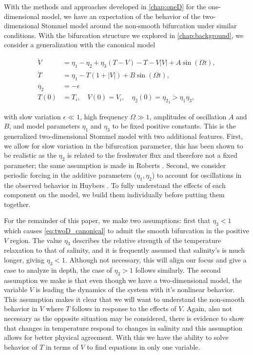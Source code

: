 With the methods and approaches developed in \autoref{chap:oneD} for the one-dimensional model, we have an expectation of the behavior of the two-dimensional Stommel model around the non-smooth bifurcation under similar conditions. With the bifurcation structure we explored in \autoref{chap:background}, we consider a generalization with the canonical model

\begin{equation}\label{eq:twoD_canonical}
  \begin{aligned}
   \dot{V} & =  \eta_1-\eta_2+\eta_3(T-V)-T-V|V|+A\sin(\Omega t), \\
   \dot{T}     & =  \eta_1-T(1+|V|)+B\sin(\Omega t),  \\
  \dot{\eta_2}  & =  -\epsilon\\
  T(0)&=T_i,\quad V(0)=V_i,\quad \eta_2(0)={\eta_2}_i>\eta_1\eta_3,
  \end{aligned}
\end{equation}

with slow variation $\epsilon\ll 1$, high frequency $\Omega\gg 1$, amplitudes of oscillation $A$ and $B$, and model parameters $\eta_1$ and $\eta_3$ to be fixed positive constants. This is the generalized two-dimensional Stommel model with two additional features. First, we allow for slow variation in the bifurcation parameter, this has been shown to be realistic as the $\eta_2$ is related to the freshwater flux and therefore not a fixed parameter; the same assumption is made in Roberts \cite{roberts2017relaxation}. Second, we consider periodic forcing in the additive parameters ($\eta_1,\eta_2$) to account for oscillations in the observed behavior in Huybers \cite{huybers2005obliquity}. To fully understand the effects of each component on the model, we build them individually before putting them together.

For the remainder of this paper, we make two assumptions: first that $\eta_3<1$ which causes \eqref{eq:twoD_canonical} to admit the smooth bifurcation in the positive $V$ region. The value $\eta_3$ describes the relative strength of the temperature relaxation to that of salinity, and it is frequently assumed that salinity's is much longer, giving $\eta_3<1$. Although not necessary, this will align our focus and give a case to analyze in depth, the case of $\eta_3>1$ follows similarly. The second assumption we make is that even though we have a two-dimensional model, the variable $V$ is leading the dynamics of the system with it's nonlinear behavior. This assumption makes it clear that we will want to understand the non-smooth behavior in $V$ where $T$ follows in response to the effects of $V$. Again, also not necessary as the opposite situation may be considered, there is evidence to show that changes in temperature respond to changes in salinity and this assumption allows for better physical agreement. With this we have the ability to solve behavior of $T$ in terms of $V$ to find equations in only one variable.

